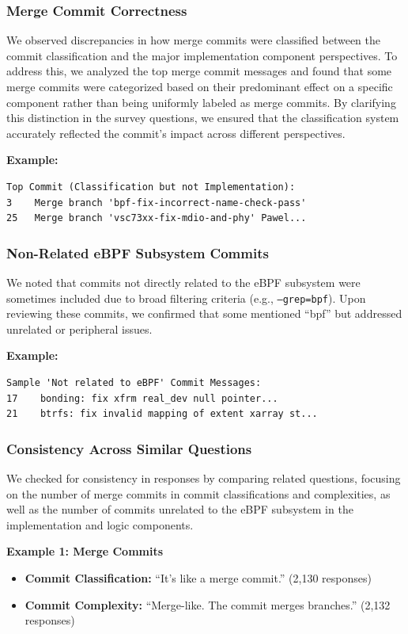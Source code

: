 \subsubsection{Merge Commit Correctness}

We observed discrepancies in how merge commits were classified between the commit classification and the major implementation component perspectives. To address this, we analyzed the top merge commit messages and found that some merge commits were categorized based on their predominant effect on a specific component rather than being uniformly labeled as merge commits. By clarifying this distinction in the survey questions, we ensured that the classification system accurately reflected the commit's impact across different perspectives.

\textbf{Example:}
\begin{verbatim}
Top Commit (Classification but not Implementation):
3    Merge branch 'bpf-fix-incorrect-name-check-pass'
25   Merge branch 'vsc73xx-fix-mdio-and-phy' Pawel...
\end{verbatim}

\subsubsection{Non-Related eBPF Subsystem Commits}

We noted that commits not directly related to the eBPF subsystem were sometimes included due to broad filtering criteria (e.g., \texttt{--grep=bpf}). Upon reviewing these commits, we confirmed that some mentioned ``bpf'' but addressed unrelated or peripheral issues.

\textbf{Example:}
\begin{verbatim}
Sample 'Not related to eBPF' Commit Messages:
17    bonding: fix xfrm real_dev null pointer...
21    btrfs: fix invalid mapping of extent xarray st...
\end{verbatim}

\subsubsection{Consistency Across Similar Questions}

We checked for consistency in responses by comparing related questions, focusing on the number of merge commits in commit classifications and complexities, as well as the number of commits unrelated to the eBPF subsystem in the implementation and logic components.

\textbf{Example 1: Merge Commits}
\begin{itemize}
    \item \textbf{Commit Classification:} ``It's like a merge commit.'' (2,130 responses)
    \item \textbf{Commit Complexity:} ``Merge-like. The commit merges branches.'' (2,132 responses)
\end{itemize}

